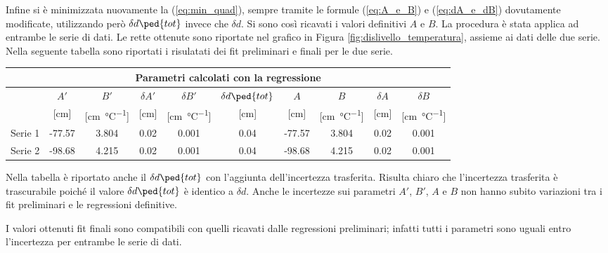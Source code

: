 Infine si è minimizzata nuovamente la (\ref{eq:min_quad}), sempre tramite le formule (\ref{eq:A_e_B}) e (\ref{eq:dA_e_dB})
dovutamente modificate, utilizzando però $\delta d\ped{tot}$ invece che $\delta d$.
%
Si sono così ricavati i valori definitivi $A$ e $B$. La procedura è stata applica ad entrambe le serie di dati.
Le rette ottenute sono riportate nel grafico in Figura \ref{fig:dislivello_temperatura}, assieme ai dati delle due serie.
Nella seguente tabella sono riportati i risulatati dei fit preliminari e finali per le due serie.

\begin{center}
    \small
    \begin{tabular}{l c c c c c | c c c c}
        \multicolumn{10}{c}{\textbf{Parametri calcolati con la regressione}} \\
        \toprule
        & $A'$ & $B'$ & $\delta A'$ & $\delta B'$ &
        $\delta d\ped{tot}$ & $A$ & $B$ & $\delta A$ & $\delta B$ \\
        & [cm] & [\si{\centi\meter\per\celsius}] & [cm] & [\si{\centi\meter\per\celsius}] &
        [cm] & [cm] & [\si{\centi\meter\per\celsius}] & [cm] & [\si{\centi\meter\per\celsius}] \\
        \midrule
        Serie 1 & -77.57 & 3.804 & 0.02 & 0.001 & 0.04 & -77.57 & 3.804 & 0.02 & 0.001 \\
        Serie 2 & -98.68 & 4.215 & 0.02 & 0.001 & 0.04 & -98.68 & 4.215 & 0.02 & 0.001 \\
        \bottomrule
    \end{tabular}
\end{center}

Nella tabella è riportato anche il $\delta d\ped{tot}$ con l'aggiunta dell'incertezza trasferita. Risulta chiaro che l'incertezza trasferita è
trascurabile poiché il valore $\delta d\ped{tot}$ è identico a $\delta d$. Anche le incertezze sui parametri $A'$, $B'$, $A$ e $B$
non hanno subito variazioni tra i fit preliminari e le regressioni definitive.

I valori ottenuti fit finali sono compatibili con quelli ricavati dalle regressioni preliminari; infatti tutti i parametri
sono uguali entro l'incertezza per entrambe le serie di dati.

